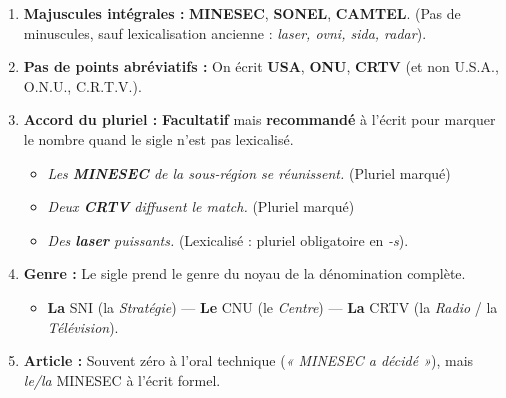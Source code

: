\documentclass[11pt]{article}
\begin{document}
\begin{propriete}
\begin{enumerate}
    \item \textbf{Majuscules intégrales :} \textbf{MINESEC}, \textbf{SONEL}, \textbf{CAMTEL}. (Pas de minuscules, sauf lexicalisation ancienne : \emph{laser, ovni, sida, radar}).
    \item \textbf{Pas de points abréviatifs :} On écrit \textbf{USA}, \textbf{ONU}, \textbf{CRTV} (et non U.S.A., O.N.U., C.R.T.V.).
    \item \textbf{Accord du pluriel :} \textbf{Facultatif} mais \textbf{recommandé} à l'écrit pour marquer le nombre quand le sigle n'est pas lexicalisé.
        \begin{itemize}
            \item \emph{Les \textbf{MINESEC} de la sous-région se réunissent.} (Pluriel marqué)
            \item \emph{Deux \textbf{CRTV} diffusent le match.} (Pluriel marqué)
            \item \emph{Des \textbf{laser} puissants.} (Lexicalisé : pluriel obligatoire en \emph{-s}).
        \end{itemize}
    \item \textbf{Genre :} Le sigle prend le genre du noyau de la dénomination complète.
        \begin{itemize}
            \item \textbf{La} SNI (la \emph{Stratégie}) — \textbf{Le} CNU (le \emph{Centre}) — \textbf{La} CRTV (la \emph{Radio} / la \emph{Télévision}).
        \end{itemize}
    \item \textbf{Article :} Souvent zéro à l'oral technique (\emph{« MINESEC a décidé »}), mais \emph{le/la} MINESEC à l'écrit formel.
\end{enumerate}
\end{propriete}
\end{document}
